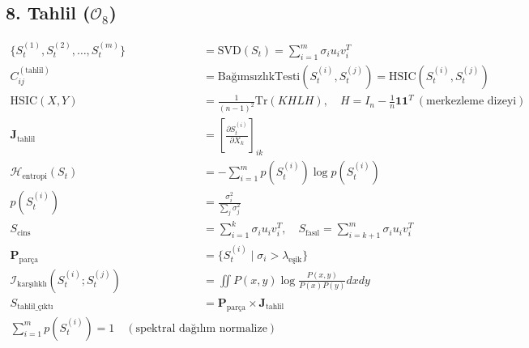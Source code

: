 \documentclass[11pt, a4paper]{article}
\begin{document}
\subsection{8. Tahlil ($\mathcal{O}_8$)}
\begin{align}
\{S_t^{(1)}, S_t^{(2)}, \dots, S_t^{(m)}\} &= \text{SVD}(S_t) = \sum_{i=1}^m \sigma_i u_i v_i^T \\
C_{ij}^{(\text{tahlil})} &= \text{BağımsızlıkTesti}(S_t^{(i)}, S_t^{(j)}) = \text{HSIC}(S_t^{(i)}, S_t^{(j)}) \\
\text{HSIC}(X, Y) &= \frac{1}{(n-1)^2} \text{Tr}(K H L H), \quad H = I_n - \tfrac{1}{n}\mathbf{1}\mathbf{1}^T \ (\text{merkezleme dizeyi}) \\
\mathbf{J}_{\text{tahlil}} &= \left[ \frac{\partial S_t^{(i)}}{\partial X_k} \right]_{ik} \\
\mathcal{H}_{\text{entropi}}(S_t) &= -\sum_{i=1}^m p(S_t^{(i)}) \log p(S_t^{(i)}) \\
p(S_t^{(i)}) &= \frac{\sigma_i^2}{\sum_j \sigma_j^2} \\
S_{\text{cins}} &= \sum_{i=1}^k \sigma_i u_i v_i^T, \quad S_{\text{fasıl}} = \sum_{i=k+1}^m \sigma_i u_i v_i^T \\
\mathbf{P}_{\text{parça}} &= \{ S_t^{(i)} \mid \sigma_i > \lambda_{\text{eşik}} \} \\
\mathcal{I}_{\text{karşılıklı}}(S_t^{(i)} ; S_t^{(j)}) &= \iint P(x, y) \log \frac{P(x, y)}{P(x)P(y)} dx dy \\
S_{\text{tahlil\_çıktı}} &= \mathbf{P}_{\text{parça}} \times \mathbf{J}_{\text{tahlil}} \\
\sum_{i=1}^m p(S_t^{(i)}) = 1 \quad (\text{spektral dağılım normalize})
\end{align}
\end{document}
